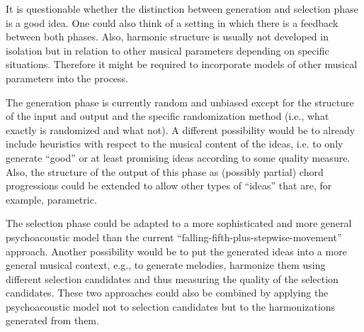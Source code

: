 It is questionable whether the distinction between generation and selection phase is a good idea.
One could also think of a setting in which there is a feedback between both phases.
Also, harmonic structure is usually not developed in isolation but in relation to other musical parameters depending on specific situations.
Therefore it might be required to incorporate models of other musical parameters into the process.

The generation phase is currently random and unbiased except for the structure of the input and output and the specific randomization method (i.e., what exactly is randomized and what not).
A different possibility would be to already include heuristics with respect to the musical content of the ideas, i.e. to only generate ``good'' or at least promising ideas according to some quality measure.
Also, the structure of the output of this phase as (possibly partial) chord progressions could be extended to allow other types of ``ideas'' that are, for example, parametric.

The selection phase could be adapted to a more sophisticated and more general psychoacoustic model than the current ``falling-fifth-plus-stepwise-movement'' approach.
Another possibility would be to put the generated ideas into a more general musical context, e.g., to generate melodies, harmonize them using different selection candidates and thus measuring the quality of the selection candidates.
These two approaches could also be combined by applying the psychoacoustic model not to selection candidates but to the harmonizations generated from them.
